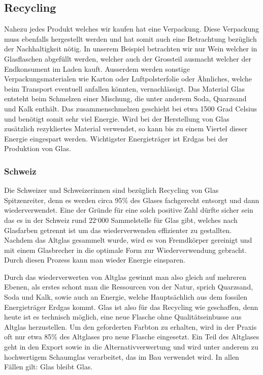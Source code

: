 \subsection{Recycling}
Nahezu jedes Produkt welches wir kaufen hat eine Verpackung. Diese Verpackung muss ebenfalls hergestellt werden und hat somit auch eine Betrachtung bezüglich der Nachhaltigkeit nötig. In unserem Beispiel betrachten wir nur Wein welcher in Glasflaschen abgefüllt werden, welcher auch der Grossteil ausmacht welcher der Endkonsument im Laden kauft. Ausserdem werden sonstige Verpackungsmaterialen wie Karton oder Luftpolsterfolie oder Ähnliches, welche beim Transport eventuell anfallen könnten, vernachlässigt. 
Das Material Glas entsteht beim Schmelzen einer Mischung, die unter anderem Soda, Quarzsand und Kalk enthält. Das zusammenschmelzen geschieht bei etwa 1500 Grad Celsius und benötigt somit sehr viel Energie. Wird bei der Herstellung von Glas zusätzlich rezykliertes Material verwendet, so kann bis zu einem Viertel dieser Energie eingespart werden. Wichtigster Energieträger ist Erdgas bei der Produktion von Glas.\cite{_glas:}
\subsubsection{Schweiz}
Die Schweizer und Schweizerinnen sind bezüglich Recycling von Glas Spitzenreiter, denn es werden circa 95\% des Glases fachgerecht entsorgt und dann wiederverwendet. 
Eine der Gründe für eine solch positive Zahl dürfte sicher sein das es in der Schweiz rund 22`000 Sammelstelle für Glas\cite{_recycling:} gibt, welches nach Glasfarben getrennt ist um das wiederverwenden effizienter zu gestallten. Nachdem das Altglas gesammelt wurde, wird es von Fremdkörper gereinigt und mit einem Glasbrecher in die optimale Form zur Wiederverwendung gebracht. Durch diesen Prozess kann man wieder Energie einsparen. 

Durch das wiederverwerten von Altglas gewinnt man also gleich auf mehreren Ebenen, als erstes schont man die Ressourcen von der Natur, sprich Quarzsand, Soda und Kalk, sowie auch an Energie, welche Hauptsächlich aus dem fossilen Energieträger Erdgas kommt. Glas ist also für das Recycling wie geschaffen, denn heute ist es technisch möglich, eine neue Flasche ohne Qualitätseinbusse aus Altglas herzustellen. Um den geforderten Farbton zu erhalten, wird in der Praxis oft nur etwa 85\% des Altglases pro neue Flasche eingesetzt. Ein Teil des Altglases geht in den Export sowie in die Alternativverwertung und wird unter anderem zu hochwertigem Schaumglas verarbeitet, das im Bau verwendet wird. 
In allen Fällen gilt: Glas bleibt Glas. \cite{_glas:}


